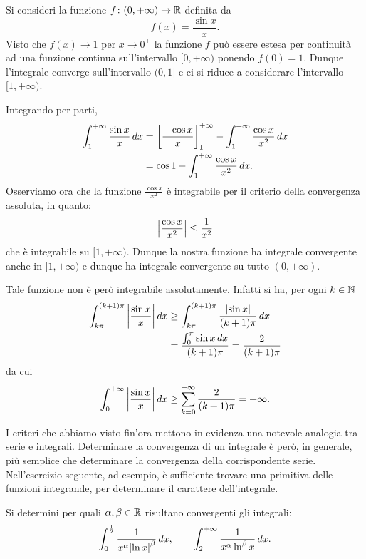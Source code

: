 \begin{example}
\mymark{*}
Si consideri la funzione $f\colon (0,+\infty) \to \mathbb R$
definita da
\[
  f(x) = \frac{\sin x }{x}.
\]
Visto che $f(x)\to 1$ per $x\to 0^+$ la funzione $f$
può essere estesa per continuità ad una funzione continua sull'intervallo
$[0,+\infty)$ ponendo $f(0)=1$.
Dunque l'integrale converge sull'intervallo $(0,1]$ e ci si
riduce a considerare l'intervallo $[1,+\infty)$.

Integrando per parti,
\begin{align*}
  \int_1^{+\infty} \frac{\sin x}{x}\, dx
  &= {\left[ \frac{-\cos x}{x} \right]}_1^{+\infty} -
  \int_1^{+\infty} \frac{\cos x}{x^2} \, dx \\
  &= \cos 1 - \int_1^{+\infty} \frac{\cos x}{x^2}\, dx.
\end{align*}
Osserviamo ora che la funzione $\frac{\cos x}{x^2}$ è integrabile
per il criterio della convergenza assoluta, in quanto:
\[
  {\left|\frac{\cos x}{x^2}\right|} \le \frac{1}{x^2}
\]
che è integrabile su $[1,+\infty)$.
Dunque la nostra funzione ha integrale convergente anche in $[1,+\infty)$
e dunque ha integrale convergente su tutto $(0,+\infty)$.

Tale funzione non è però integrabile assolutamente.
Infatti si ha,
per ogni $k\in \mathbb N$
\begin{align*}
  \int_{k\pi}^{(k+1)\pi} {\left|\frac{\sin x} x\right|}\, dx
  &\ge \int_{k\pi}^{(k+1)\pi} \frac{{\left|\sin x\right|}}{(k+1)\pi}\, dx\\
  &= \frac{\int_0^\pi \sin x \, dx}{(k+1)\pi}
  = \frac{2}{(k+1)\pi}
\end{align*}
da cui
\[
  \int_0^{+\infty} {\left|\frac{\sin x}{x}\right|}\, dx
  \ge \sum_{k=0}^{+\infty} \frac{2}{(k+1)\pi} = +\infty.
\]
\end{example}

I criteri che abbiamo visto fin'ora mettono in evidenza una notevole
analogia tra serie e integrali. Determinare la convergenza
di un integrale è però, in generale, più semplice che determinare
la convergenza della corrispondente serie.
Nell'esercizio seguente, ad esempio, è sufficiente trovare una primitiva
delle funzioni integrande, per determinare il carattere dell'integrale.

\begin{exercise}
Si determini per quali $\alpha,\beta\in \mathbb R$ risultano convergenti
gli integrali:
\[
  \int_0^{\frac 1 2} \frac{1}{x^\alpha {\left|\ln x\right|}^\beta}\, dx,
  \qquad
  \int_2^{+\infty} \frac{1}{x^\alpha \ln^\beta x} \, dx.
\]
\end{exercise}

